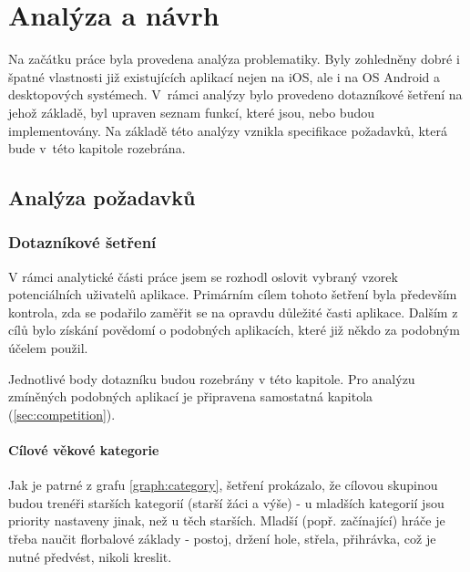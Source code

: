 \documentclass[thesis=B,czech]{FITthesis}[2012/06/26]
\begin{document}
\chapter{Analýza a návrh}

	Na začátku práce byla provedena analýza problematiky. Byly zohledněny dobré i špatné vlastnosti již existujících aplikací nejen na iOS, ale i na OS Android a desktopových systémech. V~rámci analýzy bylo provedeno dotazníkové šetření na jehož základě, byl upraven seznam funkcí, které jsou, nebo budou implementovány. Na základě této analýzy vznikla specifikace požadavků, která bude v~této kapitole rozebrána.

\section{Analýza požadavků}

\subsection{Dotazníkové šetření}\label{sec:survey}

	V rámci analytické části práce jsem se rozhodl oslovit vybraný vzorek potenciálních uživatelů aplikace. Primárním cílem tohoto šetření byla především kontrola, zda se podařilo zaměřit se na opravdu důležité časti aplikace. Dalším z cílů bylo získání povědomí o podobných aplikacích, které již někdo za podobným účelem použil.

	Jednotlivé body dotazníku budou rozebrány v této kapitole. Pro analýzu zmíněných podobných aplikací je připravena samostatná kapitola (\ref{sec:competition}).

\subsubsection{Cílové věkové kategorie} \label{sec:target_group}

	Jak je patrné z grafu \ref{graph:category}, šetření prokázalo, že cílovou skupinou budou trenéři starších kategorií (starší žáci a výše) \-- u mladších kategorií jsou priority nastaveny jinak, než u těch starších. Mladší (popř. začínající) hráče je třeba naučit florbalové základy \-- postoj, držení hole, střela, přihrávka, což je nutné předvést, nikoli kreslit.
\end{document}
